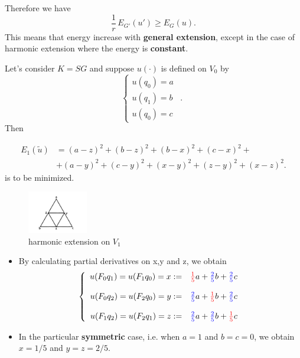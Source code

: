 \begin{frame}
Therefore we have
\begin{equation}
    \frac{1}{r}\,E_{G'}(u')\geq E_G(u).
\end{equation}
This means that energy increase with \textbf{general extension}, except in the case of harmonic extension where the energy is \textbf{constant}.
\begin{example}
    Let's consider $K=SG$ and suppose $u(\cdot)$ is defined on $V_0$ by 
$$
\left\{
\begin{array}{rcl}
   u(q_0)=a  \\
   u(q_1)=b&.\\
   u(q_0)=c&
\end{array}\right.
$$
Then 

\begin{align*}
    E_1(\tilde{u})&=(a-z)^2+(b-z)^2+(b-x)^2+(c-x)^2+\\
    &+(a-y)^2+(c-y)^2+ (x-y)^2+(z-y)^2+(x-z)^2.
\end{align*}
is to be minimized.
\end{example}
\end{frame}
\begin{frame}
\begin{figure}
\centering
\includegraphics[height=5em]{images/harmonic extension order 1.pdf}
\caption{harmonic extension on $V_1$}
\end{figure}

\begin{itemize}
\item By calculating partial derivatives on x,y and z, we obtain 
\begin{align}\label{1st harm extension}
    \left\{ \begin{array}{rcl}
        u(F_0q_1)=u(F_1q_0)=x:=& {\color{red} \frac{1}{5}}a+{\color{blue} \frac{2}{5}}b+{\color{blue} \frac{2}{5}}c \\
        \\
        u(F_0q_2)=u(F_2q_0)=y:=& {\color{blue} \frac{2}{5}}a+{\color{red} \frac{1}{5}}b+{\color{blue} \frac{2}{5}}c \\
        \\
        u(F_1q_2)=u(F_2q_1)=z:=& {\color{blue} \frac{2}{5}}a+{\color{blue} \frac{2}{5}}b+{\color{red} \frac{1}{5}}c \\
    \end{array}\right.
\end{align}

\item In the particular \textbf{symmetric} case, i.e. when $a=1$ and $b=c=0$, we obtain $x=1/5$ and $y=z=2/5$. 
\end{itemize}
\end{frame}
